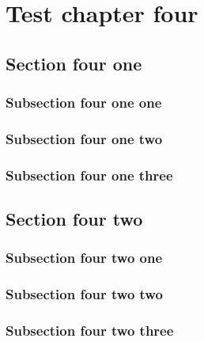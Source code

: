 \documentclass{book}
\begin{document}
\chapter{Test chapter four}
\localtableofcontents

\section{Section four one}
\subsection{Subsection four one one}
\subsection{Subsection four one two}
\subsection{Subsection four one three}
\section{Section four two}
\subsection{Subsection four two one}
\subsection{Subsection four two two}
\subsection{Subsection four two three}
\end{document}
